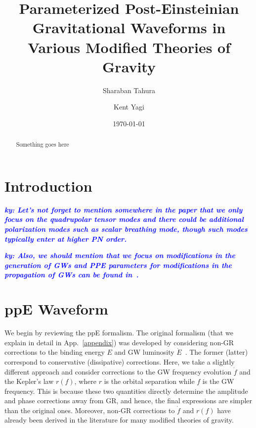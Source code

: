 \documentclass[prd,twocolumn,nofootinbib]{revtex4-1}
\newcommand{\ky}[1]{\textcolor{blue}{\it{\textbf{ky: #1}}} }
\begin{document}
\title{Parameterized Post-Einsteinian Gravitational Waveforms in \\ Various Modified Theories of Gravity}

\author{Sharaban Tahura}

\author{Kent Yagi}

\begin{abstract} 

Something goes here 

\end{abstract}

\date{\today}




\maketitle


\section{Introduction}
\ky{Let's not forget to mention somewhere in the paper that we only focus on the quadrupolar tensor modes and there could be additional polarization modes such as scalar breathing mode, though such modes typically enter at higher PN order.}

\ky{Also, we should mention that we focus on modifications in the generation of GWs and PPE parameters for modifications in the propagation of GWs can be found in~\cite{Mirshekari:2011yq,Yunes:2016jcc,Nishizawa:2017nef}.}

\section{ppE Waveform}\label{section:ppE}
We begin by reviewing the ppE formalism. The original formalism (that we explain in detail in App.~\ref{appendix}) was developed by considering non-GR corrections to the binding energy $E$ and GW luminosity $\dot E$~\cite{Yunes:2009ke,Chatziioannou:2012rf}. The former (latter) correspond to conservative (dissipative) corrections. Here, we take a slightly different approach and consider corrections to the GW frequency evolution $\dot f$ and the Kepler's law $r(f)$, where $r$ is the orbital separation while $f$ is the GW frequency. This is because these two quantities directly determine the amplitude and phase corrections away from GR, and hence, the final expressions are simpler than the original ones. Moreover, non-GR corrections to $\dot f$ and $r(f)$ have already been derived in the literature for many modified theories of gravity.
\end{document}
